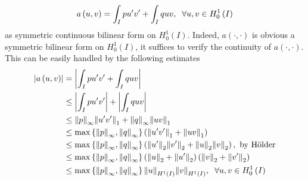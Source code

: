 \documentclass[a4paper,oneside]{book}
\numberwithin{equation}{chapter}
\begin{document}
\begin{align}
a\left( {u,v} \right) = \int_I {pu'v'}  + \int_I {quv} ,\hspace{0.2cm}\forall u,v \in H_0^1\left( I \right)
\end{align}
as symmetric continuous bilinear form on $H_0^1\left(I\right)$. Indeed, $a\left(\cdot,\cdot\right)$ is obvious a symmetric bilinear form on $H_0^1\left(I\right)$, it suffices to verify the continuity of $a\left(\cdot,\cdot\right)$. This can be easily handled by the following estimates
\begin{align}
\left| {a\left( {u,v} \right)} \right| &= \left| {\int_I {pu'v'}  + \int_I {quv} } \right|\\
& \le \left| {\int_I {pu'v'} } \right| + \left| {\int_I {quv} } \right|\\
& \le {\left\| p \right\|_\infty }{\left\| {u'v'} \right\|_1} + {\left\| q \right\|_\infty }{\left\| {uv} \right\|_1}\\
& \le \max \left\{ {{{\left\| p \right\|}_\infty },{{\left\| q \right\|}_\infty }} \right\}\left( {{{\left\| {u'v'} \right\|}_1} + {{\left\| {uv} \right\|}_1}} \right)\\
& \le \max \left\{ {{{\left\| p \right\|}_\infty },{{\left\| q \right\|}_\infty }} \right\}\left( {{{\left\| {u'} \right\|}_2}{{\left\| {v'} \right\|}_2} + {{\left\| u \right\|}_2}{{\left\| v \right\|}_2}} \right),\mbox{ by H\"{o}lder}\\
& \le \max \left\{ {{{\left\| p \right\|}_\infty },{{\left\| q \right\|}_\infty }} \right\}\left( {{{\left\| u \right\|}_2} + {{\left\| {u'} \right\|}_2}} \right)\left( {{{\left\| v \right\|}_2} + {{\left\| {v'} \right\|}_2}} \right)\\
& \le \max \left\{ {{{\left\| p \right\|}_\infty },{{\left\| q \right\|}_\infty }} \right\}{\left\| u \right\|_{{H^1}\left( I \right)}}{\left\| v \right\|_{{H^1}\left( I \right)}},\hspace{0.2cm}\forall u,v \in H_0^1\left( I \right)
\end{align}
\end{document}
